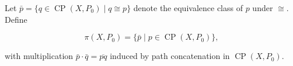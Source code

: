 Let $\bar{p} = \{ q \in \operatorname{CP}(X, P_0) \mid q \cong p \}$ denote the equivalence class of $p$ under $\cong$. Define

$$\pi(X, P_0) = \{ \bar{p} \mid p \in \operatorname{CP}(X, P_0) \},$$

with multiplication $\bar{p} \cdot \bar{q} = \overline{pq}$ induced by path concatenation in $\operatorname{CP}(X, P_0)$.
